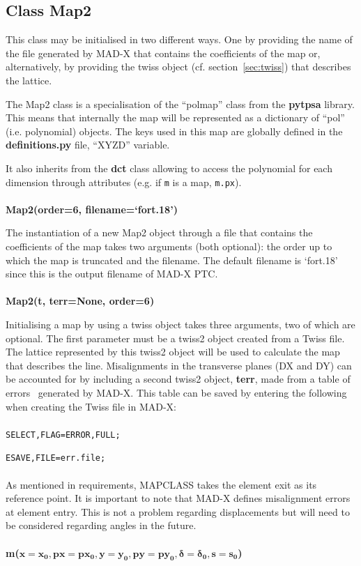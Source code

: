\documentclass[a4paper]{cernatsnote}
\begin{document}
\subsection{Class Map2}
\label{sec:map2}
This class may be initialised in two different ways. One by providing
the name of the file generated by MAD-X that contains the coefficients
of the map or, alternatively, by providing the twiss
object (cf. section~\ref{sec:twiss}) that describes the lattice.

The Map2 class is a specialisation of the ``polmap'' class from the
\textbf{pytpsa} library. This means that internally the map will be
represented as a dictionary of ``pol'' (i.e. polynomial) objects. The
keys used in this map are globally defined in the
\textbf{definitions.py} file, ``XYZD'' variable.

It also inherits from the \textbf{dct} class allowing to access the
polynomial for each dimension through attributes (e.g. if \texttt{m}
is a map, \texttt{m.px}).
\\\\
\textbf{Map2(order=6, filename=`fort.18')}

The instantiation of a new Map2 object through a file that contains
the coefficients of the map takes two arguments (both optional): the
order up to which the map is truncated and the filename. The default
filename is `fort.18' since this is the output filename of MAD-X PTC.
\\\\
\textbf{Map2(t, terr=None, order=6)}

Initialising a map by using a twiss object takes three arguments, two
of which are optional. The first parameter must be a twiss2 object
created from a Twiss file. The lattice represented by this twiss2
object will be used to calculate the map that describes the line.
Misalignments in the transverse planes (DX and DY) can be accounted for
by including a second twiss2 object, \textbf{terr}, made from a table
of errors~\cite{esave} generated by \textsc{MAD-X}. This table can be
saved by entering the following when creating the Twiss file in
\textsc{MAD-X}:
\\\\
\texttt{SELECT,FLAG=ERROR,FULL;}

\texttt{ESAVE,FILE=err.file;}
\\\\
As mentioned in requirements, \textsc{MAPCLASS} takes the element exit
as its reference point. It is important to note that \textsc{MAD-X}
defines misalignment errors at element entry. This is not a problem
regarding displacements but will need to be considered regarding
angles in the future.
\\\\
\textbf{m($\mathbf{x=x_0,px=px_0,y=y_0,py=py_0,\delta=\delta_0,s=s_0}$)}
\end{document}
